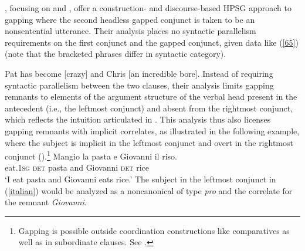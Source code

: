 \begin{sloppypar}
\citet{Abeille2014}, focusing on  and , offer a construction- and
discourse-based HPSG approach to gapping where the second headless gapped conjunct is taken to be an
nonsentential utterance.  %
Their analysis places no syntactic parallelism requirements on the
first conjunct and the gapped conjunct, given  data like (\ref{65}) (note that the bracketed phrases differ in syntactic category).
\end{sloppypar}

\ea Pat has become [crazy] and Chris [an incredible bore]. \citep[248]{Abeille2014}  \label{65}\z
%
Instead of requiring %
syntactic parallelism between the two clauses, their analysis limits gapping remnants to elements of the argument structure of the verbal head present in the antecedent (i.e., the leftmost conjunct) and absent from the rightmost conjunct, which reflects the intuition articulated in \citet{Hankamer1971}. This analysis thus also licenses gapping remnants with implicit correlates, as illustrated in the
following  example, where the subject is implicit in the leftmost conjunct and overt in the rightmost conjunct (\citealt[251]{Abeille2014}).\footnote{Gapping is possible outside coordination
constructions like comparatives as well as in 
subordinate clauses. See .}
\ea
\label{italian}
\gll Mangio la pasta e Giovanni il riso.\\
     eat.\textsc{1sg} \textsc{det} pasta and Giovanni \textsc{det} rice\\
\glt `I eat pasta and Giovanni eats rice.'
\z
%
The subject in the leftmost conjunct in (\ref{italian}) would be analyzed as a noncanonical  of type {\it pro} and the correlate for the remnant {\it Giovanni}. %

